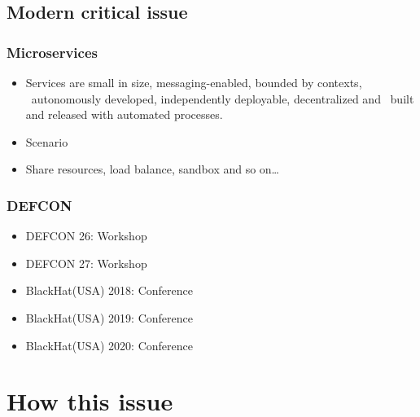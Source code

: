\documentclass{beamer}
\begin{document}
\subsection{Modern critical issue}
\begin{frame}
    \frametitle{Microservices}
    \begin{itemize}
        \item Services are small in size, messaging-enabled, bounded by contexts, \
              autonomously developed, independently deployable, decentralized and \
              built and released with automated processes.\cite{Microservice_book}
        \item Scenario
        \item Share resources, load balance, sandbox and so on\dots
    \end{itemize}
\end{frame}

\begin{frame}
    \frametitle{DEFCON}
    \begin{itemize}
        \item DEFCON 26: Workshop\cite{DEFCON26_workshop}
        \item DEFCON 27: Workshop\cite{DEFCON27_workshop}
        \item BlackHat(USA) 2018: Conference\cite{BlackHat2018}
        \item BlackHat(USA) 2019: Conference\cite{BlackHat2019}
        \item BlackHat(USA) 2020: Conference\cite{BlackHat2020}
    \end{itemize}
\end{frame}



\section{How this issue}
\end{document}
